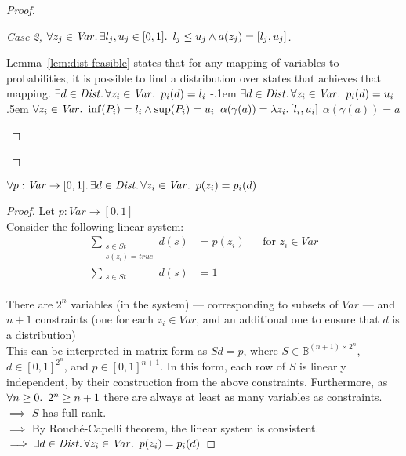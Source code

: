 \begin{prop}
\begin{proof}
\begin{proof}[Case 2, {$\forall z_j\in\mathit{Var}\ldotp\exists l_j,u_j\in[0,1]\ldotp~l_j\leq u_j\wedge a(z_j) = [l_j,u_j]$}]
\begin{itemize}
\begin{itemize}
        \end{itemize}
        \step Lemma~\ref{lem:dist-feasible} states that for any mapping of variables to probabilities, it is possible to find a distribution over states that achieves that mapping.
        \step[\imps] $\exists d\in\mathit{Dist}\ldotp\forall z_i\in\mathit{Var}\ldotp~p_i(d) = l_i$
        \itemsep-.1em
        \step[\wedge] $\exists d\in\mathit{Dist}\ldotp\forall z_i\in\mathit{Var}\ldotp~p_i(d) = u_i$
        \itemsep.5em
        \step[\imps] $\forall z_i\in\mathit{Var}\ldotp~\inf(P_i) = l_i \wedge\sup(P_i) = u_i$
        \step[\imps] $\alpha(\gamma(a)) = \lambda z_i\ldotp[l_i,u_i]$
        \step[\imps] $\alpha(\gamma(a)) = a$\qedhere
      \end{itemize}
    \end{proof}
  \end{proof}
\end{prop}

\begin{lemma}\label{lemma:dist-feasible}
  $\forall p : \mathit{Var}\to[0,1]\ldotp\exists d\in\mathit{Dist}\ldotp\forall z_i\in\mathit{Var}\ldotp~p(z_i) = p_i(d)$
  \begin{proof}
    Let $p : \mathit{Var}\to[0,1]$\\
    \noindent
    Consider the following linear system:
    \begin{align*}
      \sum_{\substack{s\in\mathit{St}\\s(z_i)=\mathit{true}}}d(s) & = p(z_i) &&\text{for } z_i\in\mathit{Var}\\
      \sum_{\substack{s\in\mathit{St}\\\phantom{s(z_i)=\mathit{true}}}} d(s) & = 1
    \end{align*}
    There are $2^n$ variables (in the system) --- corresponding to subsets of $\mathit{Var}$ --- and $n + 1$ constraints (one for each $z_i\in\mathit{Var}$, and an additional one to ensure that $d$ is a distribution)\\[1em]

    This can be interpreted in matrix form as $Sd = p$, where ${S\in\mathbb{B}^{(n+1)\times2^n}}$, ${d\in[0,1]^{2^n}}$, and ${p\in[0,1]^{n+1}}$. In this form, each row of $S$ is linearly independent, by their construction from the above constraints. Furthermore, as $\forall n\geq 0\ldotp~2^n\geq n+1$ there are always at least as many variables as constraints.\\[1em]

    \noindent
    $\implies$ $S$ has full rank.\\[1em]

    \noindent
    $\implies$ By Rouch\'e-Capelli theorem, the linear system is consistent.\\[1em]

    \noindent
    $\implies \exists d\in\mathit{Dist}\ldotp\forall z_i\in\mathit{Var}\ldotp~p(z_i) = p_i(d)$\qedhere
  \end{proof}
\end{lemma}

